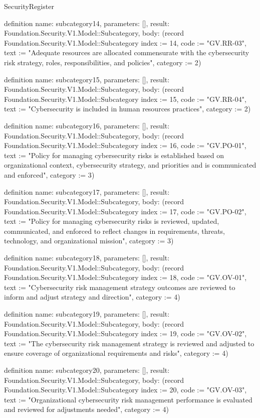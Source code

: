 \begin{lexlean}{SecurityRegister}
\begin{semanticmodule}
definition{
  name: subcategory14,
  parameters: [],
  result: Foundation.Security.V1.Model::Subcategory,
  body: (record Foundation.Security.V1.Model::Subcategory {index := 14, code := "GV.RR-03", text := "Adequate resources are allocated commensurate with the cybersecurity risk strategy, roles, responsibilities, and policies", category := 2})
}

definition{
  name: subcategory15,
  parameters: [],
  result: Foundation.Security.V1.Model::Subcategory,
  body: (record Foundation.Security.V1.Model::Subcategory {index := 15, code := "GV.RR-04", text := "Cybersecurity is included in human resources practices", category := 2})
}

definition{
  name: subcategory16,
  parameters: [],
  result: Foundation.Security.V1.Model::Subcategory,
  body: (record Foundation.Security.V1.Model::Subcategory {index := 16, code := "GV.PO-01", text := "Policy for managing cybersecurity risks is established based on organizational context, cybersecurity strategy, and priorities and is communicated and enforced", category := 3})
}

definition{
  name: subcategory17,
  parameters: [],
  result: Foundation.Security.V1.Model::Subcategory,
  body: (record Foundation.Security.V1.Model::Subcategory {index := 17, code := "GV.PO-02", text := "Policy for managing cybersecurity risks is reviewed, updated, communicated, and enforced to reflect changes in requirements, threats, technology, and organizational mission", category := 3})
}

definition{
  name: subcategory18,
  parameters: [],
  result: Foundation.Security.V1.Model::Subcategory,
  body: (record Foundation.Security.V1.Model::Subcategory {index := 18, code := "GV.OV-01", text := "Cybersecurity risk management strategy outcomes are reviewed to inform and adjust strategy and direction", category := 4})
}

definition{
  name: subcategory19,
  parameters: [],
  result: Foundation.Security.V1.Model::Subcategory,
  body: (record Foundation.Security.V1.Model::Subcategory {index := 19, code := "GV.OV-02", text := "The cybersecurity risk management strategy is reviewed and adjusted to ensure coverage of organizational requirements and risks", category := 4})
}

definition{
  name: subcategory20,
  parameters: [],
  result: Foundation.Security.V1.Model::Subcategory,
  body: (record Foundation.Security.V1.Model::Subcategory {index := 20, code := "GV.OV-03", text := "Organizational cybersecurity risk management performance is evaluated and reviewed for adjustments needed", category := 4})
}


\end{semanticmodule}
\end{lexlean}
